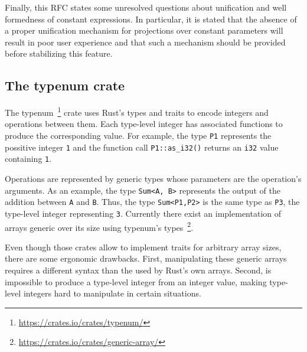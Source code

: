 Finally, this RFC states some unresolved questions about unification and well
formedness of constant expressions. In particular, it is stated that the absence
of a proper unification mechanism for projections over constant parameters will
result in poor user experience and that such a mechanism should be provided
before stabilizing this feature.

\subsection{The typenum crate}

The typenum~\footnote{\url{https://crates.io/crates/typenum/}} crate uses Rust's
types and traits to encode integers and operations between them. Each type-level
integer has associated functions to produce the corresponding value. For
example, the type \texttt{P1} represents the possitive integer \texttt{1} and
the function call \texttt{P1::as\_i32()} returns an \texttt{i32} value
containing \texttt{1}. 

Operations are represented by generic types whose parameters are the operation's
arguments. As an example, the type \texttt{Sum<A, B>} represents the output of
the addition between \texttt{A} and \texttt{B}. Thus, the type
\texttt{Sum<P1,P2>} is the same type as \texttt{P3}, the type-level integer
representing \texttt{3}. Currently there exist an implementation of arrays
generic over its size using typenum's
types~\footnote{\url{https://crates.io/crates/generic-array/}}.

Even though those crates allow to implement traits for arbitrary array sizes,
there are some ergonomic drawbacks. First, manipulating these generic arrays requires a
different syntax than the used by Rust's own arrays. Second, is impossible to
produce a type-level integer from an integer value, making type-level integers
hard to manipulate in certain situations.
